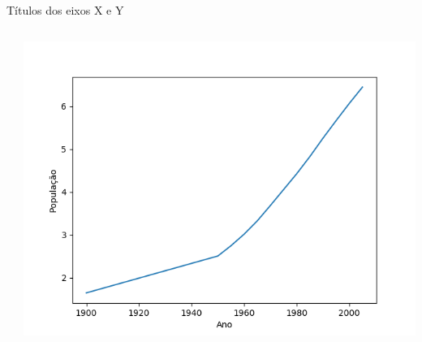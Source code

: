 %
\begin{frame}[t, fragile]{Títulos dos eixos X e Y}
  \begin{columns}
    \begin{column}{0.55\textwidth}
          
    \end{column}

    \begin{column}{0.45\textwidth}
      \begin{center}
        \includegraphics[scale=.35]{aula-2/figuras/matplotlib-customization-2.png}
      \end{center}
    \end{column}
  \end{columns}
\end{frame}
%
